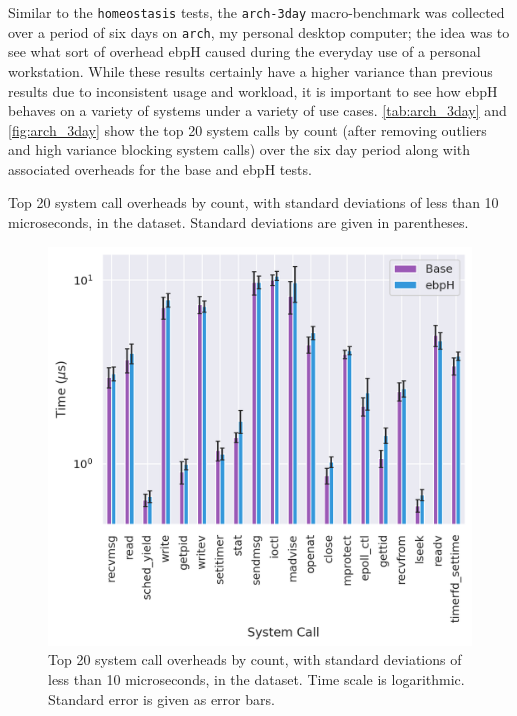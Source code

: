 \documentclass[
  12pt]{findlay}
\newcommand{\passthrough}[1]{#1}
\begin{document}
\label{arch_3day}

Similar to the \passthrough{\lstinline!homeostasis!} tests, the
\passthrough{\lstinline!arch-3day!} macro-benchmark was collected over a
period of six days on \passthrough{\lstinline!arch!}, my personal
desktop computer; the idea was to see what sort of overhead ebpH caused
during the everyday use of a personal workstation. While these results
certainly have a higher variance than previous results due to
inconsistent usage and workload, it is important to see how ebpH behaves
on a variety of systems under a variety of use cases.
\autoref{tab:arch_3day} and \autoref{fig:arch_3day} show the top 20
system calls by count (after removing outliers and high variance
blocking system calls) over the six day period along with associated
overheads for the base and ebpH tests.

\begin{table}
    \caption[Top 20 system call overheads by count in the  dataset]{
        Top 20 system call overheads by count, with standard deviations of less than 10 microseconds,
        in the  dataset.
        Standard deviations are given in parentheses.
    }
    \label{tab:arch_3day}
    \resizebox{\columnwidth}{!}{
    
    }
\end{table}

\begin{figure}
    \caption[Top 20 system call overheads by count in the  dataset]{
        Top 20 system call overheads by count, with standard deviations of less than 10 microseconds,
        in the  dataset.
        Time scale is logarithmic. Standard error is given as error bars.
    }
    \label{fig:arch_3day}
    \includegraphics[width=.8\textwidth]{../data/bench/arch-3day/arch_3day_times.png}
\end{figure}
\end{document}
